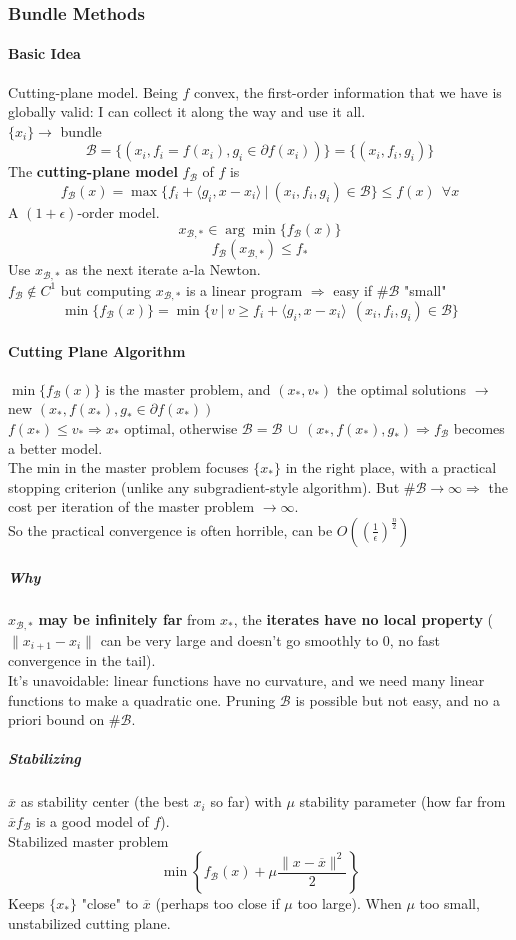 \documentclass[10pt]{report}
\begin{document}
\subsubsection{Bundle Methods}
\paragraph{Basic Idea} Cutting-plane model. Being $f$ convex, the first-order information that we have is globally valid: I can collect it along the way and use it all.\\
$\{x_i\}\rightarrow$ bundle $$\mathscr{B}=\{(x_i, f_i = f(x_i), g_i\in\partial f(x_i))\} = \{(x_i, f_i, g_i)\}$$
The \textbf{cutting-plane model} $f_\mathscr{B}$ of $f$ is $$f_\mathscr{B}(x) = \max\{f_i+\langle g_i, x-x_i\rangle\:|\:(x_i, f_i, g_i)\in \mathscr{B}\}\leq f(x)\:\:\forall x$$ A $(1+\epsilon)$-order model.
$$x_{\mathscr{B},*}\in \arg\min\{f_\mathscr{B}(x)\}$$ $$f_\mathscr{B}(x_{\mathscr{B},*})\leq f_*$$ Use $x_{\mathscr{B},*}$ as the next iterate a-la Newton.\\
$f_\mathscr{B}\not\in C^1$ but computing $x_{\mathscr{B},*}$ is a linear program $\Rightarrow$ easy if $\# \mathscr{B}$ "small" $$\min\{f_\mathscr{B}(x)\}=\min\{v\:|\:v\geq f_i+\langle g_i, x-x_i\rangle\:\:(x_i, f_i, g_i)\in \mathscr{B}\}$$
\paragraph{Cutting Plane Algorithm} $\min\{f_\mathscr{B}(x)\}$ is the master problem, and $(x_*, v_*)$ the optimal solutions $\rightarrow$ new $(x_*, f(x_*), g_*\in\partial f(x_*))$\\
$f(x_*)\leq v_*\Rightarrow x_*$ optimal, otherwise $\mathscr{B}= \mathscr{B}\:\cup\:(x_*, f(x_*), g_*)\Rightarrow f_\mathscr{B}$ becomes a better model.\\
The min in the master problem focuses $\{x_*\}$ in the right place, with a practical stopping criterion (unlike any subgradient-style algorithm). But $\#\mathscr{B}\rightarrow\infty\Rightarrow$ the cost per iteration of the master problem $\rightarrow\infty$.\\
So the practical convergence is often horrible, can be $O\left( \left(\frac{1}{\epsilon}\right)^{\frac{n}{2}}\right)$
\subparagraph{Why} $x_{\mathscr{B},*}$ \textbf{may be infinitely far} from $x_*$, the \textbf{iterates have no local property} ($\|x_{i+1}-x_i\|$ can be very large and doesn't go smoothly to $0$, no fast convergence in the tail).\\
It's unavoidable: linear functions have no curvature, and we need many linear functions to make a quadratic one. Pruning $\mathscr{B}$ is possible but not easy, and no a priori bound on $\# \mathscr{B}$.
\subparagraph{Stabilizing} $\overline{x}$ as stability center (the best $x_i$ so far) with $\mu$ stability parameter (how far from $\overline{x} f_\mathscr{B}$ is a good model of $f$).\\
Stabilized master problem $$\min\left\{f_\mathscr{B}(x)+\mu\frac{\|x-\overline{x}\|^2}{2}\right\}$$ Keeps $\{x_*\}$ "close" to $\overline{x}$ (perhaps too close if $\mu$ too large). When $\mu$ too small, unstabilized cutting plane.
\end{document}

